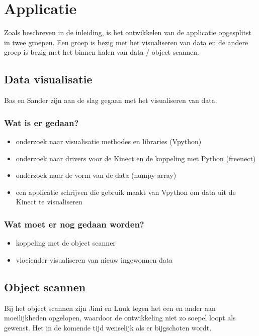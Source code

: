 \documentclass[10pt,a4paper]{article}
\begin{document}
\section{Applicatie}
Zoals beschreven in de inleiding, is het ontwikkelen van de applicatie opgesplitst in twee groepen. Een groep is bezig met het visualiseren van data en de andere groep is bezig met het binnen halen van data / object scannen.
\subsection{Data visualisatie}
Bas en Sander zijn aan de slag gegaan met het visualiseren van data. 
\subsubsection{Wat is er gedaan?}
\begin{itemize}
\item onderzoek naar visualisatie methodes en libraries (Vpython)
\item onderzoek naar drivers voor de Kinect en de koppeling met Python (freenect)
\item onderzoek naar de vorm van de data (numpy array)
\item een applicatie schrijven die gebruik maakt van Vpython om data uit de Kinect te visualiseren
\end{itemize}
\subsubsection{Wat moet er nog gedaan worden?}
\begin{itemize}
\item koppeling met de object scanner
\item vloeiender visualiseren van nieuw ingewonnen data
\end{itemize}

\subsection{Object scannen}
Bij het object scannen zijn Jimi en Luuk tegen het een en ander aan moeilijkheden opgelopen, waardoor de ontwikkeling niet zo soepel loopt als gewenst. Het in de komende tijd wenselijk als er bijgschoten wordt. 
\end{document}

